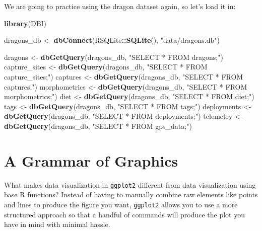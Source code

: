 \documentclass[
]{book}
\newenvironment{Shaded}{\begin{snugshade}}{\end{snugshade}}
\newcommand{\FunctionTok}[1]{\textcolor[rgb]{0.13,0.29,0.53}{\textbf{#1}}}
\newcommand{\NormalTok}[1]{#1}
\newcommand{\OtherTok}[1]{\textcolor[rgb]{0.56,0.35,0.01}{#1}}
\newcommand{\SpecialCharTok}[1]{\textcolor[rgb]{0.81,0.36,0.00}{\textbf{#1}}}
\newcommand{\StringTok}[1]{\textcolor[rgb]{0.31,0.60,0.02}{#1}}
\begin{document}
We are going to practice using the dragon dataset again, so let's load it in:

\begin{Shaded}
\begin{Highlighting}[]
\FunctionTok{library}\NormalTok{(DBI)}

\NormalTok{dragons\_db }\OtherTok{\textless{}{-}} \FunctionTok{dbConnect}\NormalTok{(RSQLite}\SpecialCharTok{::}\FunctionTok{SQLite}\NormalTok{(), }\StringTok{"data/dragons.db"}\NormalTok{)}

\NormalTok{dragons }\OtherTok{\textless{}{-}} \FunctionTok{dbGetQuery}\NormalTok{(dragons\_db, }\StringTok{"SELECT * FROM dragons;"}\NormalTok{)}
\NormalTok{capture\_sites }\OtherTok{\textless{}{-}} \FunctionTok{dbGetQuery}\NormalTok{(dragons\_db, }\StringTok{"SELECT * FROM capture\_sites;"}\NormalTok{)}
\NormalTok{captures }\OtherTok{\textless{}{-}} \FunctionTok{dbGetQuery}\NormalTok{(dragons\_db, }\StringTok{"SELECT * FROM captures;"}\NormalTok{)}
\NormalTok{morphometrics }\OtherTok{\textless{}{-}} \FunctionTok{dbGetQuery}\NormalTok{(dragons\_db, }\StringTok{"SELECT * FROM morphometrics;"}\NormalTok{)}
\NormalTok{diet }\OtherTok{\textless{}{-}} \FunctionTok{dbGetQuery}\NormalTok{(dragons\_db, }\StringTok{"SELECT * FROM diet;"}\NormalTok{)}
\NormalTok{tags }\OtherTok{\textless{}{-}} \FunctionTok{dbGetQuery}\NormalTok{(dragons\_db, }\StringTok{"SELECT * FROM tags;"}\NormalTok{)}
\NormalTok{deployments }\OtherTok{\textless{}{-}} \FunctionTok{dbGetQuery}\NormalTok{(dragons\_db, }\StringTok{"SELECT * FROM deployments;"}\NormalTok{)}
\NormalTok{telemetry }\OtherTok{\textless{}{-}} \FunctionTok{dbGetQuery}\NormalTok{(dragons\_db, }\StringTok{"SELECT * FROM gps\_data;"}\NormalTok{)}
\end{Highlighting}
\end{Shaded}

\hypertarget{a-grammar-of-graphics}{%
\section{A Grammar of Graphics}\label{a-grammar-of-graphics}}

What makes data visualization in \texttt{ggplot2} different from data visualization
using base R functions? Instead of having to manually combine raw elements like
points and lines to produce the figure you want, \texttt{ggplot2} allows you to use a
more structured approach so that a handful of commands will produce the plot you
have in mind with minimal hassle.
\end{document}

